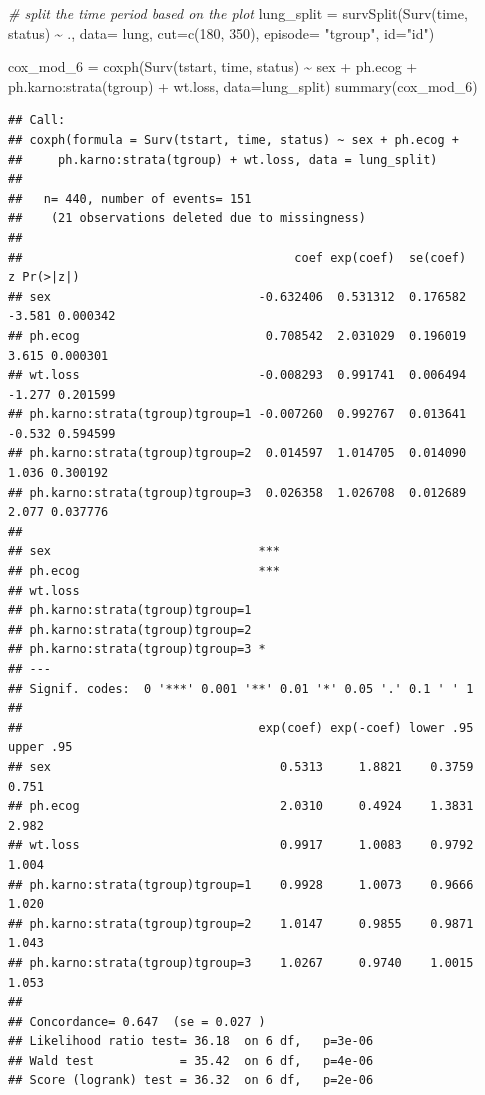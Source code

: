 \documentclass[
]{article}
\newenvironment{Shaded}{\begin{snugshade}}{\end{snugshade}}
\newcommand{\AttributeTok}[1]{\textcolor[rgb]{0.77,0.63,0.00}{#1}}
\newcommand{\CommentTok}[1]{\textcolor[rgb]{0.56,0.35,0.01}{\textit{#1}}}
\newcommand{\DecValTok}[1]{\textcolor[rgb]{0.00,0.00,0.81}{#1}}
\newcommand{\FunctionTok}[1]{\textcolor[rgb]{0.00,0.00,0.00}{#1}}
\newcommand{\NormalTok}[1]{#1}
\newcommand{\OtherTok}[1]{\textcolor[rgb]{0.56,0.35,0.01}{#1}}
\newcommand{\SpecialCharTok}[1]{\textcolor[rgb]{0.00,0.00,0.00}{#1}}
\newcommand{\StringTok}[1]{\textcolor[rgb]{0.31,0.60,0.02}{#1}}
\begin{document}
\begin{Shaded}
\begin{Highlighting}[]
\CommentTok{\# split the time period based on the plot}
\NormalTok{lung\_split }\OtherTok{=} \FunctionTok{survSplit}\NormalTok{(}\FunctionTok{Surv}\NormalTok{(time, status) }\SpecialCharTok{\textasciitilde{}}\NormalTok{ ., }\AttributeTok{data=}\NormalTok{ lung, }\AttributeTok{cut=}\FunctionTok{c}\NormalTok{(}\DecValTok{180}\NormalTok{, }\DecValTok{350}\NormalTok{), }\AttributeTok{episode=} \StringTok{"tgroup"}\NormalTok{, }\AttributeTok{id=}\StringTok{"id"}\NormalTok{)}

\NormalTok{cox\_mod\_6 }\OtherTok{=} \FunctionTok{coxph}\NormalTok{(}\FunctionTok{Surv}\NormalTok{(tstart, time, status) }\SpecialCharTok{\textasciitilde{}}\NormalTok{ sex }\SpecialCharTok{+}\NormalTok{ ph.ecog }\SpecialCharTok{+}\NormalTok{ ph.karno}\SpecialCharTok{:}\FunctionTok{strata}\NormalTok{(tgroup) }\SpecialCharTok{+}\NormalTok{ wt.loss, }\AttributeTok{data=}\NormalTok{lung\_split)}
\FunctionTok{summary}\NormalTok{(cox\_mod\_6)}
\end{Highlighting}
\end{Shaded}

\begin{verbatim}
## Call:
## coxph(formula = Surv(tstart, time, status) ~ sex + ph.ecog + 
##     ph.karno:strata(tgroup) + wt.loss, data = lung_split)
## 
##   n= 440, number of events= 151 
##    (21 observations deleted due to missingness)
## 
##                                      coef exp(coef)  se(coef)      z Pr(>|z|)
## sex                             -0.632406  0.531312  0.176582 -3.581 0.000342
## ph.ecog                          0.708542  2.031029  0.196019  3.615 0.000301
## wt.loss                         -0.008293  0.991741  0.006494 -1.277 0.201599
## ph.karno:strata(tgroup)tgroup=1 -0.007260  0.992767  0.013641 -0.532 0.594599
## ph.karno:strata(tgroup)tgroup=2  0.014597  1.014705  0.014090  1.036 0.300192
## ph.karno:strata(tgroup)tgroup=3  0.026358  1.026708  0.012689  2.077 0.037776
##                                    
## sex                             ***
## ph.ecog                         ***
## wt.loss                            
## ph.karno:strata(tgroup)tgroup=1    
## ph.karno:strata(tgroup)tgroup=2    
## ph.karno:strata(tgroup)tgroup=3 *  
## ---
## Signif. codes:  0 '***' 0.001 '**' 0.01 '*' 0.05 '.' 0.1 ' ' 1
## 
##                                 exp(coef) exp(-coef) lower .95 upper .95
## sex                                0.5313     1.8821    0.3759     0.751
## ph.ecog                            2.0310     0.4924    1.3831     2.982
## wt.loss                            0.9917     1.0083    0.9792     1.004
## ph.karno:strata(tgroup)tgroup=1    0.9928     1.0073    0.9666     1.020
## ph.karno:strata(tgroup)tgroup=2    1.0147     0.9855    0.9871     1.043
## ph.karno:strata(tgroup)tgroup=3    1.0267     0.9740    1.0015     1.053
## 
## Concordance= 0.647  (se = 0.027 )
## Likelihood ratio test= 36.18  on 6 df,   p=3e-06
## Wald test            = 35.42  on 6 df,   p=4e-06
## Score (logrank) test = 36.32  on 6 df,   p=2e-06
\end{verbatim}
\end{document}
